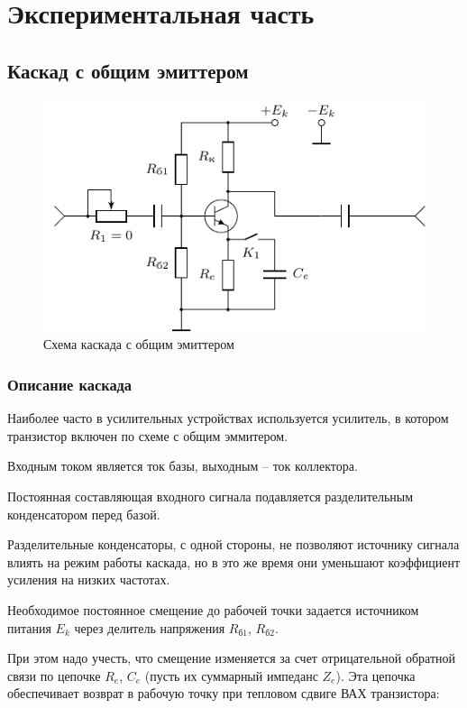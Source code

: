 \newpage
\section{Экспериментальная часть}
\subsection{Каскад с общим эмиттером}
\begin{figure}[H]
	\centering
	\includegraphics[scale=1.4]{ris/common_emitter} 
	\caption{Схема каскада с общим эмиттером}
	\label{fig:chem_oe}
\end{figure}
\subsubsection{Описание каскада}
Наиболее часто в усилительных устройствах используется усилитель, в котором транзистор включен по схеме с общим эммитером. 

Входным током является ток базы, выходным -- ток коллектора. 

Постоянная составляющая входного сигнала подавляется разделительным конденсатором перед базой.

Разделительные конденсаторы, с одной стороны, не позволяют источнику сигнала влиять на режим работы каскада, но в это же время они уменьшают коэффициент усиления на низких частотах.

Необходимое постоянное смещение до рабочей точки задается источником питания $E_k$ через делитель напряжения $R_\text{б1}$, $R_\text{б2}$. 

При этом надо учесть, что смещение изменяется за счет отрицательной обратной связи по цепочке $R_e$, $C_e$ (пусть их суммарный импеданс $Z_e$). Эта цепочка обеспечивает возврат в рабочую точку при тепловом сдвиге ВАХ транзистора:

